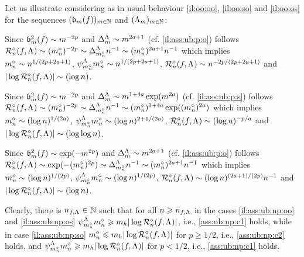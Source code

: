 \begin{il}\label{il:ass:ub:np}
Let us illustrate 
  considering as in  usual
  behaviour \ref{il:oo:oo}, \ref{il:oo:so} and \ref{il:oo:os}
 for the sequences $\Nsuite[\Di]{\bias[\Di](\xdf)}$ and
  $\Nsuite[\Di]{\iSv[\Di]}$:
 \begin{Liste}[]
\item[\mylabel{il:ass:ub:np:oo}{\dg\bfseries{[o-o]}}] Since
  $\bias^2(\xdf)\sim\Di^{-2p}$ and  $\DipenSv\sim\Di^{2a+1}$
    (cf.   \ref{il:ass:ub:p:o}) follows
    $\hRa{\xdf,\iSv}\sim(\aDi{\ssY})^{-2p}\sim\DipenSv[\aDi{\ssY}]\ssY^{-1}\sim(\aDi{\ssY})^{2a+1}\ssY^{-1}$ which
    implies $\aDi{\ssY}\sim\ssY^{1/(2p+2a+1)}$,
    $\cmiSv[\aDi{\ssY}]\aDi{\ssY}\sim\ssY^{1/(2p+2a+1)}$,
    $\hRa{\xdf,\iSv}\sim\ssY^{-2p/(2p+2a+1)}$ and $|\log\hRa{\xdf,\iSv}|\sim(\log\ssY)$.
 \item[\mylabel{il:ass:ub:np:os}{\dg\bfseries{[o-s]}}]
    Since
  $\bias^2(\xdf)\sim\Di^{-2p}$ and $\DipenSv\sim\Di^{1+4a}\exp(\Di^{2a})$ (cf.  \ref{il:ass:ub:p:s}) follows
    $\hRa{\xdf,\iSv}\sim(\aDi{\ssY})^{-2p}\sim\DipenSv[\aDi{\ssY}]\ssY^{-1}\sim(\aDi{\ssY})^{1+4a}\exp((\aDi{\ssY})^{2a})$
    which implies  $\aDi{\ssY}\sim(\log\ssY)^{1/(2a)}$, $\cmiSv[\aDi{\ssY}]\aDi{\ssY}\sim(\log\ssY)^{2+1/(2a)}$, 
    $\hRa{\xdf,\iSv}\sim(\log\ssY)^{-p/a}$ and $|\log\hRa{\xdf,\iSv}|\sim(\log\log\ssY)$.
 \item[\mylabel{il:ass:ub:np:so}{\dg\bfseries{[s-o]}}]  Since
  $\bias^2(\xdf)\sim\exp(-\Di^{2p})$ and    $\DipenSv\sim\Di^{2a+1}$
    (cf.   \ref{il:ass:ub:p:o}) follows
    $\hRa{\xdf,\iSv}\sim\exp(-(\aDi{\ssY})^{2p})\sim\DipenSv[\aDi{\ssY}]\ssY^{-1}\sim
(\aDi{\ssY})^{2a+1}\ssY^{-1}$
    which implies  $\aDi{\ssY}\sim(\log\ssY)^{1/(2p)}$, $\cmiSv[\aDi{\ssY}]\aDi{\ssY}\sim(\log\ssY)^{1/(2p)}$,
    $\hRa{\xdf,\iSv}\sim(\log\ssY)^{(2a+1)/(2p)}\ssY^{-1}$
    and     $|\log\hRa{\xdf,\iSv}|\sim(\log\ssY)$.
  \end{Liste}
Clearly,  there is ${\ssY}_{\xdf,\iSv}\in\Nz$ such that for all
$\ssY\geq{\ssY}_{\xdf,\iSv}$ in the cases \ref{il:ass:ub:np:oo} and
\ref{il:ass:ub:np:os}   $\cmiSv[\aDi{\ssY}]\aDi{\ssY}\geq
\Di_{\ydf}|\log\hRa{\xdf,\iSv}|$, i.e., 
\ref{ass:ub:np:c1} holds, while in case \ref{il:ass:ub:np:so}
$\aDi{\ssY}\leq \Di_{\ydf}|\log\hRa{\xdf,\iSv}|$ for $p\geq1/2$, i.e., 
\ref{ass:ub:np:c2} holds, and $\cmiSv[\aDi{\ssY}]\aDi{\ssY}\geq
\Di_{\ydf}|\log\hRa{\xdf,\iSv}|$ for $p<1/2$, i.e., 
\ref{ass:ub:np:c1} holds.
\end{il}

